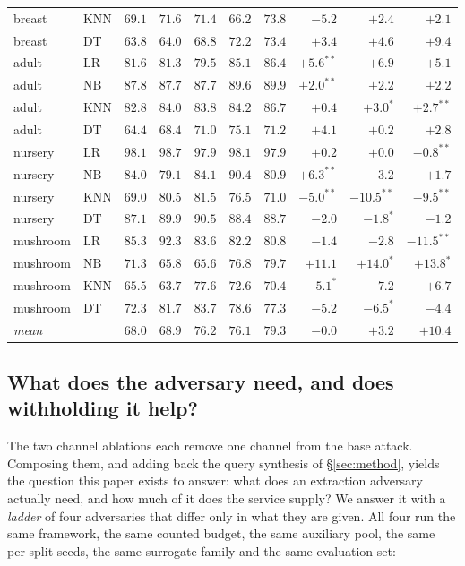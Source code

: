 \documentclass[sigconf,anonymous,review]{acmart}
\begin{document}
\begin{table}[t]
\begin{tabular}{llrrrrrrrr}
breast     & KNN  & $69.1$ & $71.6$ & $71.4$ & $66.2$ & $73.8$ & $-5.2$ & $+2.4$ & $+2.1$ \\
breast     & DT   & $63.8$ & $64.0$ & $68.8$ & $72.2$ & $73.4$ & $+3.4$ & $+4.6$ & $+9.4$ \\
\addlinespace
adult      & LR   & $81.6$ & $81.3$ & $79.5$ & $85.1$ & $86.4$ & $+5.6^{**}$ & $+6.9$ & $+5.1$ \\
adult      & NB   & $87.8$ & $87.7$ & $87.7$ & $89.6$ & $89.9$ & $+2.0^{**}$ & $+2.2$ & $+2.2$ \\
adult      & KNN  & $82.8$ & $84.0$ & $83.8$ & $84.2$ & $86.7$ & $+0.4$ & $+3.0^{*}$ & $+2.7^{**}$ \\
adult      & DT   & $64.4$ & $68.4$ & $71.0$ & $75.1$ & $71.2$ & $+4.1$ & $+0.2$ & $+2.8$ \\
\addlinespace
nursery    & LR   & $98.1$ & $98.7$ & $97.9$ & $98.1$ & $97.9$ & $+0.2$ & $+0.0$ & $-0.8^{**}$ \\
nursery    & NB   & $84.0$ & $79.1$ & $84.1$ & $90.4$ & $80.9$ & $+6.3^{**}$ & $-3.2$ & $+1.7$ \\
nursery    & KNN  & $69.0$ & $80.5$ & $81.5$ & $76.5$ & $71.0$ & $-5.0^{**}$ & $-10.5^{**}$ & $-9.5^{**}$ \\
nursery    & DT   & $87.1$ & $89.9$ & $90.5$ & $88.4$ & $88.7$ & $-2.0$ & $-1.8^{*}$ & $-1.2$ \\
\addlinespace
mushroom   & LR   & $85.3$ & $92.3$ & $83.6$ & $82.2$ & $80.8$ & $-1.4$ & $-2.8$ & $-11.5^{**}$ \\
mushroom   & NB   & $71.3$ & $65.8$ & $65.6$ & $76.8$ & $79.7$ & $+11.1$ & $+14.0^{*}$ & $+13.8^{*}$ \\
mushroom   & KNN  & $65.5$ & $63.7$ & $77.6$ & $72.6$ & $70.4$ & $-5.1^{*}$ & $-7.2$ & $+6.7$ \\
mushroom   & DT   & $72.3$ & $81.7$ & $83.7$ & $78.6$ & $77.3$ & $-5.2$ & $-6.5^{*}$ & $-4.4$ \\
\midrule
\multicolumn{2}{l}{\emph{mean}} & $68.0$ & $68.9$ & $76.2$ & $76.1$ & $79.3$ & $-0.0$ & $+3.2$ & $+10.4$ \\
\bottomrule
\end{tabular}
\end{table}

\subsection{What does the adversary need, and does withholding it help?}
\label{subsec:ladder}
The two channel ablations each remove one channel from the base attack. Composing them, and adding back the query
synthesis of \S\ref{sec:method}, yields the question this paper exists to answer: what does an
extraction adversary actually need, and how much of it does the service supply? We answer it with a
\emph{ladder} of four adversaries that differ only in what they are given. All four run the same
framework, the same counted budget, the same auxiliary pool, the same per-split seeds, the same
surrogate family and the same evaluation set:
\end{document}
